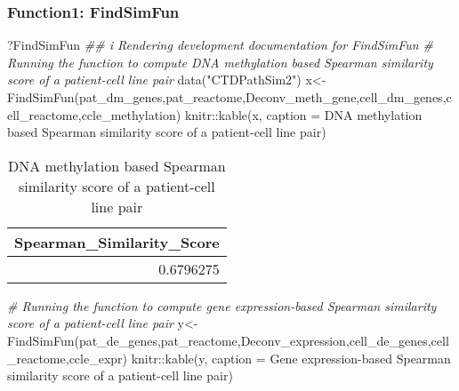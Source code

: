 \documentclass[]{article}
\newcommand{\hlstr}[1]{\textcolor[rgb]{0.251,0.627,0.251}{#1}}%
\newcommand{\hlcom}[1]{\textcolor[rgb]{0.502,0.502,0.502}{\textit{#1}}}%
\newcommand{\hlstd}[1]{\textcolor[rgb]{0.251,0.251,0.251}{#1}}%
\newenvironment{Shaded}{\begin{myshaded}}{\end{myshaded}}
\newcommand{\SpecialCharTok}[1]{\hlstr{#1}}
\newcommand{\StringTok}[1]{\hlstr{#1}}
\newcommand{\CommentTok}[1]{\hlcom{#1}}
\newcommand{\DocumentationTok}[1]{\hlcom{#1}}
\newcommand{\OtherTok}[1]{{#1}}
\newcommand{\FunctionTok}[1]{\hlstd{#1}}
\newcommand{\AttributeTok}[1]{{#1}}
\newcommand{\NormalTok}[1]{\hlstd{#1}}
\begin{document}
\hypertarget{function1-findsimfun}{%
\subsubsection{\texorpdfstring{ Function1: FindSimFun}{  Function1: FindSimFun}}\label{function1-findsimfun}}

\begin{Shaded}
\begin{Highlighting}[]
\NormalTok{?FindSimFun}
\DocumentationTok{\#\# i Rendering development documentation for \textquotesingle{}FindSimFun\textquotesingle{}}
\CommentTok{\# Running the function to compute DNA methylation based Spearman similarity score of a patient{-}cell line pair}
\FunctionTok{data}\NormalTok{(}\StringTok{"CTDPathSim2"}\NormalTok{)}
\NormalTok{x}\OtherTok{\textless{}{-}}\FunctionTok{FindSimFun}\NormalTok{(pat\_dm\_genes,pat\_reactome,Deconv\_meth\_gene,cell\_dm\_genes,cell\_reactome,ccle\_methylation)}
\NormalTok{knitr}\SpecialCharTok{::}\FunctionTok{kable}\NormalTok{(x, }\AttributeTok{caption =} \StringTok{\textquotesingle{}DNA methylation based Spearman similarity score of a patient{-}cell line pair\textquotesingle{}}\NormalTok{)}
\end{Highlighting}
\end{Shaded}

\begin{table}

\caption{\label{tab:unnamed-chunk-84}DNA methylation based Spearman similarity score of a patient-cell line pair}
\centering
\begin{tabular}[t]{r}
\hline
Spearman\_Similarity\_Score\\
\hline
0.6796275\\
\hline
\end{tabular}
\end{table}

\begin{Shaded}
\begin{Highlighting}[]
\CommentTok{\# Running the function to compute gene expression{-}based Spearman similarity score of a patient{-}cell line pair}
\NormalTok{y}\OtherTok{\textless{}{-}}\FunctionTok{FindSimFun}\NormalTok{(pat\_de\_genes,pat\_reactome,Deconv\_expression,cell\_de\_genes,cell\_reactome,ccle\_expr)}
\NormalTok{knitr}\SpecialCharTok{::}\FunctionTok{kable}\NormalTok{(y, }\AttributeTok{caption =} \StringTok{\textquotesingle{}Gene expression{-}based Spearman similarity score of a patient{-}cell line pair\textquotesingle{}}\NormalTok{)}
\end{Highlighting}
\end{Shaded}
\end{document}
